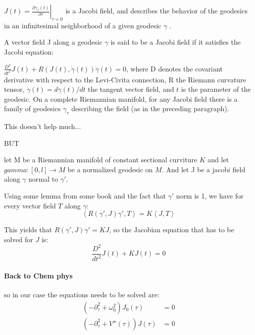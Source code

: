 \documentclass[12pt,a4paper]{article}
\numberwithin{equation}{section}
\begin{document}
$J(t)=\left.{\frac  {\partial \gamma _{\tau }(t)}{\partial \tau }}\right|_{{\tau =0}}$
is a Jacobi field, and describes the behavior of the geodesics in an infinitesimal neighborhood of a given geodesic $\gamma$ .

A vector field J along a geodesic $\gamma$  is said to be a Jacobi field if it satisfies the Jacobi equation:

${\frac  {D^{2}}{dt^{2}}}J(t)+R(J(t),{\dot  \gamma }(t)){\dot  \gamma }(t)=0$,
where D denotes the covariant derivative with respect to the Levi-Civita connection, R the Riemann curvature tensor, ${\dot  \gamma }(t)=d\gamma (t)/dt$ the tangent vector field, and $t$ is the parameter of the geodesic. On a complete Riemannian manifold, for any Jacobi field there is a family of geodesics $\gamma _{\tau }$ describing the field (as in the preceding paragraph).

This doesn't help much...

BUT

 let M be a Riemannian manifold of constant sectional curviture $K$ and let $gamma : [0,l] \rightarrow M$ be a normalized geodesic on $M$. And let J be a jacobi field along $\gamma$ normal to $\gamma'$.

Using some lemma from some book and the fact that $\gamma'$ norm is 1, we have for every vector field $T$ along $\gamma$:
\begin{equation}
\left\langle R(\gamma',J)\gamma' , T  \right\rangle = K \left\langle J, T \right\rangle
\end{equation}

This yields that $R(\gamma',J)\gamma' = KJ$, so the Jacobian equation that has to be solved for $J$ is:
\begin{equation}
\frac{D^2}{dt^2} J(t) + KJ(t) = 0
\end{equation}


\paragraph{Back to Chem phys} so in our case the equations needs to be solved are:
\begin{align}
(-\partial_\tau^2 + \omega_0^2 ) J_0 (\tau) &= 0 \\
(-\partial_\tau^2 + V''(\tau) ) J (\tau) &= 0
\end{align}

{\color{red}{Nem látom, hogy miért lennének ezek a peremfeltételek}}
\end{document}
